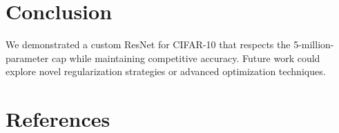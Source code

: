 \documentclass[letterpaper]{article}
\begin{document}
\section{Conclusion}
We demonstrated a custom ResNet for CIFAR-10 that respects the 5-million-parameter cap while maintaining competitive accuracy. Future work could explore novel regularization strategies or advanced optimization techniques.

\section{References}


\end{document}
